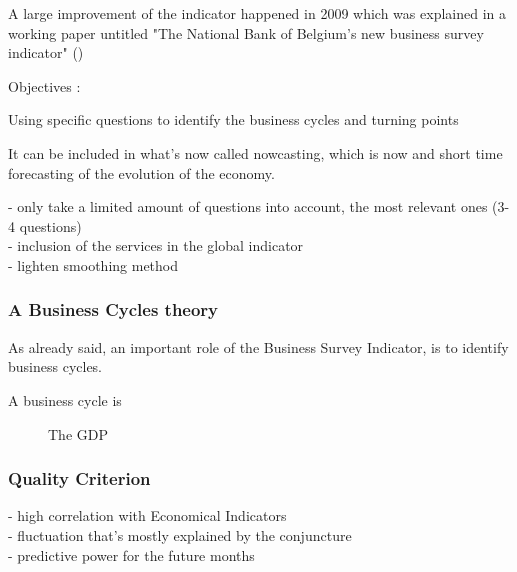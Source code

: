 \documentclass[12pt,a4paper,oneside]{book}
\begin{document}
A large improvement of the indicator happened in 2009 which was explained in a working paper untitled "The National Bank of Belgium’s new business survey indicator" 
(\citeauthor{de_greef_national_2009})

Objectives : 

Using specific questions to identify the business cycles and turning points

It can be included in what's now called nowcasting, which is now and short time forecasting of the evolution of the economy.

- only take a limited amount of questions into account, the most relevant ones (3-4 questions) \\
- inclusion of the services in the global indicator \\
- lighten smoothing method

\subsubsection{A Business Cycles theory}

As already said, an important role of the Business Survey Indicator, is to identify business cycles.

A business cycle is 

\begin{figure}
    \centering
{}
    \caption{The GDP}
    \label{fig:Business Cycle}
\end{figure}



\subsubsection{Quality Criterion}
- high correlation with Economical Indicators \\
- fluctuation that's mostly explained by the conjuncture\\
- predictive power for the future months 
\end{document}
